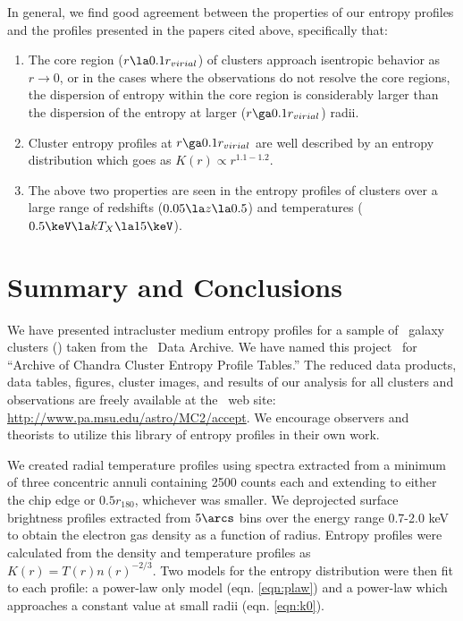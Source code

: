 \documentclass{emulateapj}
\begin{document}
In general, we find good agreement between the properties of our
entropy profiles and the profiles presented in the papers cited above,
specifically that:
\begin{enumerate}
\item The core region ($r \la 0.1 r_{virial}$) of clusters approach
  isentropic behavior as $r \rightarrow 0$, or in the cases where the
  observations do not resolve the core regions, the dispersion of
  entropy within the core region is considerably larger than the
  dispersion of the entropy at larger ($r \ga 0.1 r_{virial}$) radii.
\item Cluster entropy profiles at $r \ga 0.1 r_{virial}$ are well
  described by an entropy distribution which goes as $K(r) \propto
  r^{1.1-1.2}$.
\item The above two properties are seen in the entropy profiles of
  clusters over a large range of redshifts ($0.05 \la z \la 0.5$) and
  temperatures ($0.5 \keV \la kT_X \la 15 \keV$).
\end{enumerate}  

\section{Summary and Conclusions}
\label{sec:summary}

We have presented intracluster medium entropy profiles for a sample of
\numcluster\ galaxy clusters (\expt) taken from the \chandra\ Data
Archive. We have named this project \accept\ for ``Archive of Chandra
Cluster Entropy Profile Tables.'' The reduced data products, data
tables, figures, cluster images, and results of our analysis for all
clusters and observations are freely available at the \accept\ web
site: \url{http://www.pa.msu.edu/astro/MC2/accept}. We encourage
observers and theorists to utilize this library of entropy profiles in
their own work.

We created radial temperature profiles using spectra extracted from a
minimum of three concentric annuli containing 2500 counts each and
extending to either the chip edge or $0.5 r_{180}$, whichever was
smaller. We deprojected surface brightness profiles extracted from
$5\arcs$ bins over the energy range 0.7-2.0 keV to obtain the electron
gas density as a function of radius. Entropy profiles were calculated
from the density and temperature profiles as $K(r) =
T(r)n(r)^{-2/3}$. Two models for the entropy distribution were then
fit to each profile: a power-law only model (eqn. \ref{eqn:plaw}) and
a power-law which approaches a constant value at small radii
(eqn. \ref{eqn:k0}).
\end{document}

